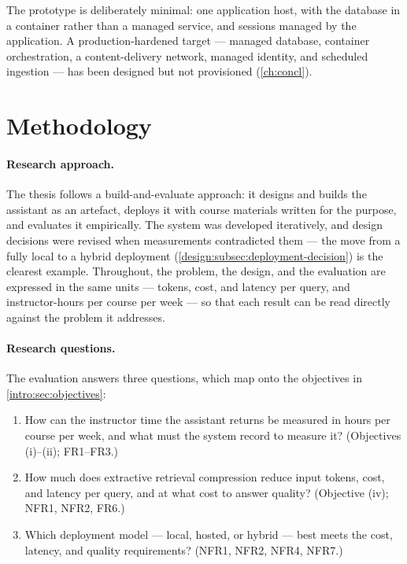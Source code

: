 The prototype is deliberately minimal: one application host, with the
database in a container rather than a managed service, and sessions managed
by the application. A production-hardened target --- managed database,
container orchestration, a content-delivery network, managed identity, and
scheduled ingestion --- has been designed but not provisioned
(\autoref{ch:concl}).

\section{Methodology}
\label{design:sec:methodology}

\paragraph{Research approach.} The thesis follows a build-and-evaluate
approach: it designs and builds the assistant as an artefact, deploys it with
course materials written for the purpose, and evaluates it empirically. The
system was developed iteratively, and design decisions were revised when
measurements contradicted them --- the move from a fully local to a hybrid
deployment (\autoref{design:subsec:deployment-decision}) is the clearest
example. Throughout, the problem, the design, and the evaluation are
expressed in the same units --- tokens, cost, and latency per query, and
instructor-hours per course per week --- so that each result can be read
directly against the problem it addresses.

\paragraph{Research questions.} The evaluation answers three questions,
which map onto the objectives in \autoref{intro:sec:objectives}:

\begin{enumerate}[label=\textbf{RQ\arabic*}, leftmargin=*, nosep]
  \item How can the instructor time the assistant returns be measured in
        hours per course per week, and what must the system record to
        measure it? (Objectives (i)--(ii); FR1--FR3.)
  \item How much does extractive retrieval compression reduce input tokens,
        cost, and latency per query, and at what cost to answer quality?
        (Objective (iv); NFR1, NFR2, FR6.)
  \item Which deployment model --- local, hosted, or hybrid --- best meets
        the cost, latency, and quality requirements? (NFR1, NFR2, NFR4,
        NFR7.)
\end{enumerate}

